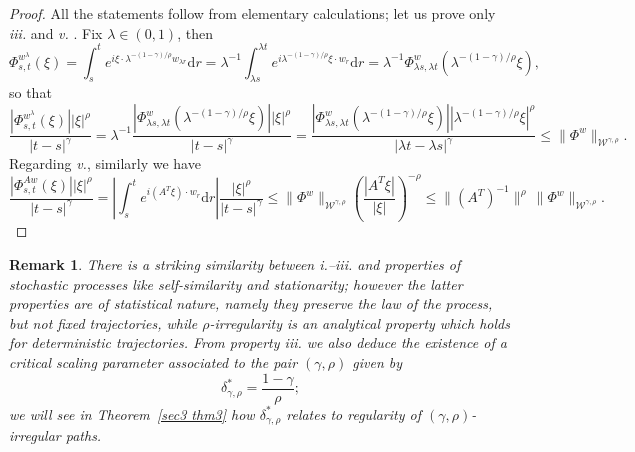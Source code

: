 \documentclass[10pt]{article}
\newcommand{\comma}{{,}}
\newcommand{\mathd}{\mathrm{d}}
\newcommand{\tmem}[1]{{\em #1\/}}
\newcommand{\tmtextit}[1]{{\itshape{#1}}}
\newtheorem{remark}[theorem]{Remark}
\begin{document}
\begin{proof}
  All the statements follow from elementary calculations; let us prove only
  {\tmem{iii.}} and {\tmem{v.}} . Fix $\lambda \in (0, 1)$, then
  \[ \Phi_{s, t}^{w^{\lambda}} (\xi) = \int_s^t e^{i \xi \cdot \lambda^{- (1 -
     \gamma) / \rho} w_{\lambda r}} \mathd r = \lambda^{- 1} \int_{\lambda
     s}^{\lambda t} e^{i \lambda^{- (1 - \gamma) / \rho} \xi \cdot w_r} \mathd
     r = \lambda^{- 1} \Phi^w_{\lambda s, \lambda t} (\lambda^{- (1 - \gamma)
     / \rho} \xi), \]
  so that
  \[ \frac{| \Phi_{s, t}^{w^{\lambda}} (\xi) | | \xi |^{\rho}}{| t - s
     |^{\gamma}} = \lambda^{- 1} \frac{| \Phi^w_{\lambda s, \lambda t}
     (\lambda^{- (1 - \gamma) / \rho} \xi) | | \xi |^{\rho}}{| t - s
     |^{\gamma}} = \frac{| \Phi^w_{\lambda s, \lambda t} (\lambda^{- (1 -
     \gamma) / \rho} \xi) | | \lambda^{- (1 - \gamma) / \rho} \xi |^{\rho}}{|
     \lambda t - \lambda s |^{\gamma}} \leqslant \| \Phi^w
     \|_{\mathcal{W}^{\gamma, \rho}} . \]
  Regarding {\tmem{v.}}, similarly we have
  \[ \frac{| \Phi^{A w}_{s, t} (\xi) | | \xi |^{\rho}}{| t - s |^{\gamma}} =
     \left| \int_s^t e^{i (A^T \xi) \cdot w_r} \mathd r \right| \frac{| \xi
     |^{\rho}}{| t - s |^{\gamma}} \leqslant \| \Phi^w
     \|_{\mathcal{W}^{\gamma, \rho}} \left( \frac{| A^T \xi |}{| \xi |}
     \right)^{- \rho} \leqslant \| (A^T)^{- 1} \|^{\rho} \, \| \Phi^w
     \|_{\mathcal{W}^{\gamma \comma \rho}} . \]
\end{proof}

\begin{remark}
  There is a striking similarity between \tmtextit{i.}--\tmtextit{iii.} and
  properties of stochastic processes like self\mbox{-}similarity and
  stationarity; however the latter properties are of statistical nature,
  namely they preserve the \tmtextit{law} of the process, but not fixed
  trajectories, while $\rho$\mbox{-}irregularity is an analytical property
  which holds for deterministic trajectories. From property \tmtextit{iii.} we
  also deduce the existence of a critical scaling parameter associated to the
  pair $(\gamma, \rho)$ given by
  \begin{equation}
    \delta^{\ast}_{\gamma, \rho} = \frac{1 - \gamma}{\rho} ; \label{sec2.2
    critical parameter}
  \end{equation}
  we will see in Theorem~\ref{sec3 thm3} how $\delta^{\ast}_{\gamma, \rho}$
  relates to regularity of $(\gamma, \rho)$\mbox{-}irregular paths.
\end{remark}
\end{document}
